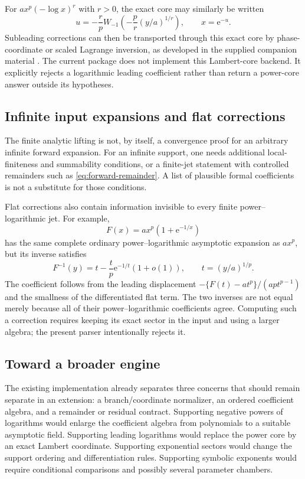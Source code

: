 \documentclass[11pt,a4paper]{article}
\numberwithin{equation}{section}
\theoremstyle{definition}\newtheorem{definition}[theorem]{Definition}
\theoremstyle{remark}\newtheorem{remark}[theorem]{Remark}
\newcommand{\e}{\mathrm e}
\begin{document}
For $a x^p(-\log x)^r$ with $r>0$, the exact core may similarly be written
\[
 u=-\frac rp W_{-1}\!\left(-\frac pr(y/a)^{1/r}\right),\qquad x=\e^{-u}.
\]
Subleading corrections can then be transported through this exact core
by phase-coordinate or scaled Lagrange inversion, as developed in the
supplied companion material \cite{companion}. The current package does
not implement this Lambert-core backend. It explicitly rejects a
logarithmic leading coefficient rather than return a power-core answer
outside its hypotheses.

\subsection{Infinite input expansions and flat corrections}

The finite analytic lifting is not, by itself, a convergence proof for
an arbitrary infinite forward expansion. For an infinite support, one
needs additional local-finiteness and summability conditions, or a
finite-jet statement with controlled remainders such as
\cref{eq:forward-remainder}. A list of plausible formal coefficients is
not a substitute for those conditions.

Flat corrections also contain information invisible to every finite
power--logarithmic jet. For example,
\[
 F(x)=a x^p(1+\e^{-1/x})
\]
has the same complete ordinary power--logarithmic asymptotic expansion
as $a x^p$, but its inverse satisfies
\[
 F^{-1}(y)=t-\frac tp\e^{-1/t}(1+o(1)),\qquad t=(y/a)^{1/p}.
\]
The coefficient follows from the leading displacement
$-\{F(t)-a t^p\}/(ap t^{p-1})$ and the smallness of the differentiated flat
term. The two inverses are not equal merely because all of their
power--logarithmic coefficients agree. Computing such a correction
requires keeping its exact sector in the input and using a larger
algebra; the present parser intentionally rejects it.

\subsection{Toward a broader engine}

The existing implementation already separates three concerns that should
remain separate in an extension: a branch/coordinate normalizer, an
ordered coefficient algebra, and a remainder or residual contract.
Supporting negative powers of logarithms would enlarge the coefficient
algebra from polynomials to a suitable asymptotic field. Supporting
leading logarithms would replace the power core by an exact Lambert
coordinate. Supporting exponential sectors would change the support
ordering and differentiation rules. Supporting symbolic exponents would
require conditional comparisons and possibly several parameter chambers.
\end{document}
